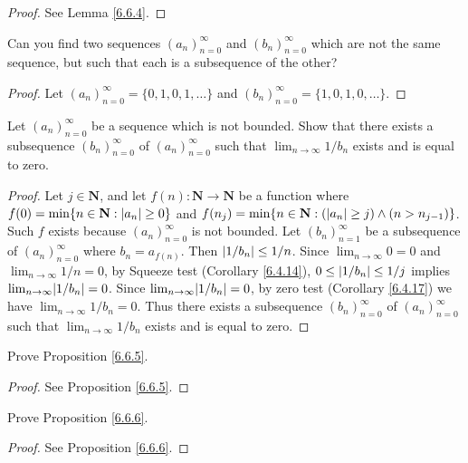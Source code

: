 \begin{proof}
    See Lemma \ref{6.6.4}.
\end{proof}

\begin{exercise}\label{ex 6.6.2}
    Can you find two sequences \((a_n)_{n = 0}^\infty\) and \((b_n)_{n = 0}^\infty\) which are not the same sequence, but such that each is a subsequence of the other?
\end{exercise}

\begin{proof}
    Let \((a_n)_{n = 0}^\infty = \{0, 1, 0, 1, \dots\}\) and \((b_n)_{n = 0}^\infty = \{1, 0, 1, 0, \dots\}\).
\end{proof}

\begin{exercise}\label{ex 6.6.3}
    Let \((a_n)_{n = 0}^\infty\) be a sequence which is not bounded.
    Show that there exists a subsequence \((b_n)_{n = 0}^\infty\) of \((a_n)_{n = 0}^\infty\) such that \(\lim_{n \to \infty} 1 / b_n\) exists and is equal to zero.
\end{exercise}

\begin{proof}
    Let \(j \in \mathbf{N}\), and let \(f(n) : \mathbf{N} \to \mathbf{N}\) be a function where \(f(0) = \min\{n \in \mathbf{N} : \abs*{a_n} \geq 0\}\) and \(f(n_j) = \min\{n \in \mathbf{N} : (\abs*{a_n} \geq j) \land (n > n_{j - 1})\}\).
    Such \(f\) exists because \((a_n)_{n = 0}^\infty\) is not bounded.
    Let \((b_n)_{n = 1}^\infty\) be a subsequence of \((a_n)_{n = 0}^\infty\) where \(b_n = a_{f(n)}\).
    Then \(\abs*{1 / b_n} \leq 1 / n\).
    Since \(\lim_{n \to \infty} 0 = 0\) and \(\lim_{n \to \infty} 1 / n = 0\), by Squeeze test (Corollary \ref{6.4.14}), \(0 \leq \abs*{1 / b_n} \leq 1 / j\) implies \(\lim_{n \to \infty} \abs*{1 / b_n} = 0\).
    Since \(\lim_{n \to \infty} \abs*{1 / b_n} = 0\), by zero test (Corollary \ref{6.4.17}) we have \(\lim_{n \to \infty} 1 / b_n = 0\).
    Thus there exists a subsequence \((b_n)_{n = 0}^\infty\) of \((a_n)_{n = 0}^\infty\) such that \(\lim_{n \to \infty} 1 / b_n\) exists and is equal to zero.
\end{proof}

\begin{exercise}\label{ex 6.6.4}
    Prove Proposition \ref{6.6.5}.
\end{exercise}

\begin{proof}
    See Proposition \ref{6.6.5}.
\end{proof}

\begin{exercise}\label{ex 6.6.5}
    Prove Proposition \ref{6.6.6}.
\end{exercise}

\begin{proof}
    See Proposition \ref{6.6.6}.
\end{proof}